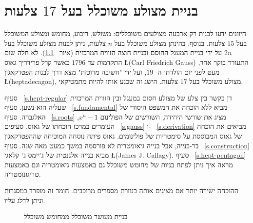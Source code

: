 

\chapter{בניית מצולע משוכלל בעל 
$17$
צלעות}
\label{c.heptadecagon}


היוונים ידעו לבנות רק ארבעה מצולעים משוכללים: משולש, ריבוע, מחומש ומצולע המשוכלל בעל 
$15$
צלעות. בנוסף, בהינתן מצולע משוכלל בעל
$n$
צלעות, ניתן לבנות מצולע משוכלל בעל
$2n$
על ידי בניית המעגל החוסם ובניית חוצה הזווית המרכזית (איור%
~\ref{f.hept-double}).
לא חלה שום התקדמות עד
$1796$
כאשר קרל פרידריך גאוס
\L{(Carl Friedrich Gauss)}
התעורר בוקר אחד, מעט לפני יום הולדתו ה-%
$19$,
ועל ידי "חשיבה מרוכזת" מצא דרך לבנות הפטדקאגון
\L{(heptadecagon)},
מצולע משוכלל בעל
$17$
צלעות. הישג זה שכנע אותו להיות מתמטיקאי.

סעיף%
~\ref{s.hept-regular}
דן בקשר בין צלע של מצולע חסום במעגל ובין הזווית המרכזית שעליה הוא נשען. סעיף%
~\ref{s.fundamental}
מביא ללא הוכחה את המשפט היסודי של האלגברה. סעיף%
~\ref{s.roots}
מציג את שורשי היחידה, השורשים של הפולינום
$x^n-1$,
העומדים במרכז הוכחתו של גאוס.
סעיפים%
~\ref{s.gauss}
ו-%
~\ref{s.derivation}
מביאים את הוכחה של גאוס
המבוססת על סימטריות של פולינומים. גאוס
פיתח נוסחה המוכיחה שההפטדקאגון
בר-בנייה, אבל בנייה גיאומטרית לא פורסמה במשך כמעט מאה שנה. סעיף%
~\ref{s.construction}
מביא בנייה אלגנטית של ג'יימס ג' קלאגי
\L{(James J. Callagy)}.
סעיף%
~\ref{s.hept-pentagon}
מראה איך ניתן לפתח בניות של מחומש משוכלל גם באמצעות גיאומטריה וגם באמצעות טריגונומטריה.

ההוכחה ישירה יותר אם מציגים אותה בעזרת מספרים מרוכבים. חומר זה מופרד במסגרות וניתן לדלג עליו.
\begin{figure}[tb]
\begin{center}
\end{center}
\caption{בניית מעושר משוכלל ממחומש משוכלל}\label{f.hept-double}
\end{figure}

